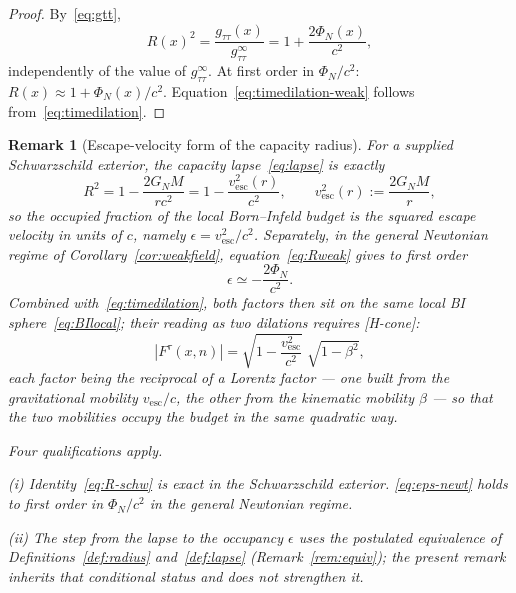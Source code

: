 \documentclass[11pt,a4paper]{article}
\newtheorem{remark}[theorem]{Remark}
\begin{document}
    \begin{proof}
      By~\eqref{eq:gtt},
      \[
        R(x)^2 = \frac{g_{\tau\tau}(x)}{g_{\tau\tau}^\infty} = 1 + \frac{2\Phi_N(x)}{c^2},
      \]
      independently of the value of $g_{\tau\tau}^\infty$.
      At first order in $\Phi_N/c^2$: $R(x) \approx 1 + \Phi_N(x)/c^2$.
      Equation~\eqref{eq:timedilation-weak} follows from~\eqref{eq:timedilation}.
    \end{proof}

    \begin{remark}[Escape-velocity form of the capacity radius]\label{rem:escape}
      For a supplied Schwarzschild exterior, the capacity lapse~\eqref{eq:lapse} is exactly
      \begin{equation}\label{eq:R-schw}
        R^2 = 1 - \frac{2 G_N M}{r c^2} = 1 - \frac{v_{\mathrm{esc}}^2(r)}{c^2},
        \qquad
        v_{\mathrm{esc}}^2(r) := \frac{2 G_N M}{r},
      \end{equation}
      so the occupied fraction of the local Born--Infeld budget is the squared escape velocity in units
      of $c$, namely $\epsilon = v_{\mathrm{esc}}^2/c^2$.
      Separately, in the general Newtonian regime of Corollary~\ref{cor:weakfield},
      equation~\eqref{eq:Rweak} gives to first order
      \begin{equation}\label{eq:eps-newt}
        \epsilon \simeq -\frac{2\Phi_N}{c^2}.
      \end{equation}
      Combined with~\eqref{eq:timedilation}, both factors then sit on the same local BI
      sphere~\eqref{eq:BIlocal}; their reading as two dilations requires [H-cone]:
      \begin{equation}\label{eq:two-mobilities}
        |F^\tau(x,n)|
        = \sqrt{1 - \frac{v_{\mathrm{esc}}^2}{c^2}}\;\sqrt{1 - \beta^2},
      \end{equation}
      each factor being the \emph{reciprocal} of a Lorentz factor --- one built from the gravitational
      mobility $v_{\mathrm{esc}}/c$, the other from the kinematic mobility $\beta$ --- so that the two
      mobilities occupy the budget in the same quadratic way.

      Four qualifications apply.

      \noindent
      (i) Identity~\eqref{eq:R-schw} is exact in the Schwarzschild exterior.
      \eqref{eq:eps-newt} holds to first order in $\Phi_N/c^2$ in the general Newtonian regime.

      \noindent
      (ii) The step from the lapse to the occupancy $\epsilon$ uses the postulated equivalence of
      Definitions~\ref{def:radius} and~\ref{def:lapse} (Remark~\ref{rem:equiv}); the present remark
      inherits that conditional status and does not strengthen it.


\end{remark}
\end{document}
